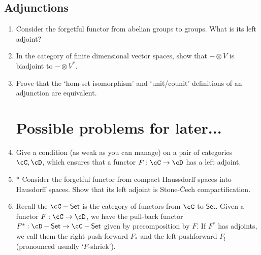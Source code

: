 \documentclass[12pt]{amsart}
\begin{document}
\subsection{Adjunctions}
\begin{enumerate}
\item Consider the forgetful functor from abelian groups to groups. What is its left adjoint?
\item In the category of finite dimensional vector spaces, show that $- \otimes V$ is biadjoint to $- \otimes V^*$.
\item Prove that the `hom-set isomorphism' and `unit/counit' definitions of an adjunction are equivalent.


\section{Possible problems for later...}
\item Give a condition (as weak as you can manage) on a pair of categories $\cC, \cD$, which ensures that a functor $F : \cC \to \cD$ has a left adjoint.
\item* Consider the forgetful functor from compact Haussdorff spaces into Hausdorff spaces. Show that its left adjoint is Stone-\v{C}ech compactification.
\item Recall the $\cC-\mathsf{Set}$ is the category of functors from $\cC$ to $\mathsf{Set}$. Given a functor $F : \cC \to \cD$, we have the pull-back functor $F^* : \cD-\mathsf{Set} \to \cC-\mathsf{Set}$ given by precomposition by $F$. If $F^*$ has adjoints, we call them the right push-forward $F_*$ and the left pushforward $F_!$ (pronounced usually `$F$-shriek').


\end{enumerate}
\end{document}
